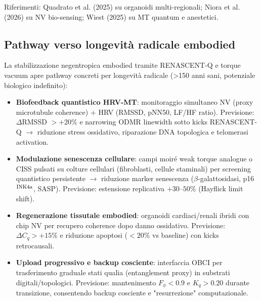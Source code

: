 \documentclass[11pt,a4paper]{article}
\theoremstyle{plain}
\theoremstyle{definition}
\begin{document}
Riferimenti: Quadrato et al. (2025) su organoidi multi-regionali; Niora et al. (2026) su NV bio-sensing; Wiest (2025) su MT quantum e anestetici.





\vspace{0.5cm}




\subsection{Pathway verso longevità radicale embodied}
\label{subsec:longevity-pathways}

\vspace{0.2cm}

La stabilizzazione negentropica embodied tramite RENASCENT-Q e torque vacuum apre pathway concreti per longevità radicale (>150 anni sani, potenziale biologico indefinito):


\vspace{0.3cm}

\begin{itemize}
    \item \textbf{Biofeedback quantistico HRV-MT}: monitoraggio simultaneo NV (proxy microtubule coherence) + HRV (RMSSD, pNN50, LF/HF ratio). Previsione: $\Delta$RMSSD $> +20\%$ e narrowing ODMR linewidth sotto kicks RENASCENT-Q $\to$ riduzione stress ossidativo, riparazione DNA topologica e telomerasi activation.



    \vspace{0.2cm}
    \item \textbf{Modulazione senescenza cellulare}: campi moiré weak torque analogue o CISS pulsati su colture cellulari (fibroblasti, cellule staminali) per screening quantistico persistente $\to$ riduzione marker senescenza ($\beta$-galattosidasi, p16$^{\rm INK4a}$, SASP). Previsione: estensione replicativa $+30$--$50\%$ (Hayflick limit shift).

    
\vspace{0.2cm}

    \item \textbf{Regenerazione tissutale embodied}: organoidi cardiaci/renali ibridi con chip NV per recupero coherence dopo danno ossidativo. Previsione: $\Delta C_q > +15\%$ e riduzione apoptosi ($<20\%$ vs baseline) con kicks retrocausali.

    \vspace{0.2cm}
    \item \textbf{Upload progressivo e backup cosciente}: interfaccia OBCI per trasferimento graduale stati qualia (entanglement proxy) in substrati digitali/topologici. Previsione: mantenimento $F_\phi < 0.9$ e $K_q > 0.20$ durante transizione, consentendo backup cosciente e "resurrezione" computazionale.
\end{itemize}
\end{document}
